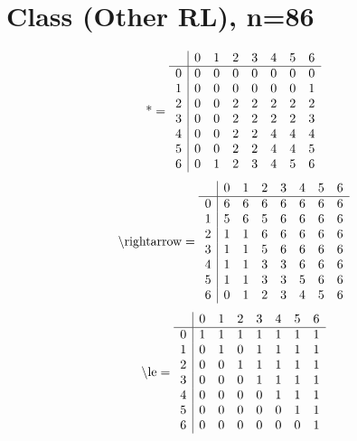 \documentclass[11pt]{article}
\begin{document}
\section{Class (Other RL), n=86}
\[\text{*} = 
\begin{array}{r | r r r r r r r}
 & 0 & 1 & 2 & 3 & 4 & 5 & 6 \\ \hline
0 & 0 & 0 & 0 & 0 & 0 & 0 & 0 \\
1 & 0 & 0 & 0 & 0 & 0 & 0 & 1 \\
2 & 0 & 0 & 2 & 2 & 2 & 2 & 2 \\
3 & 0 & 0 & 2 & 2 & 2 & 2 & 3 \\
4 & 0 & 0 & 2 & 2 & 4 & 4 & 4 \\
5 & 0 & 0 & 2 & 2 & 4 & 4 & 5 \\
6 & 0 & 1 & 2 & 3 & 4 & 5 & 6 \\
\end{array}
\]
\[\text{\textbackslash rightarrow} = 
\begin{array}{r | r r r r r r r}
 & 0 & 1 & 2 & 3 & 4 & 5 & 6 \\ \hline
0 & 6 & 6 & 6 & 6 & 6 & 6 & 6 \\
1 & 5 & 6 & 5 & 6 & 6 & 6 & 6 \\
2 & 1 & 1 & 6 & 6 & 6 & 6 & 6 \\
3 & 1 & 1 & 5 & 6 & 6 & 6 & 6 \\
4 & 1 & 1 & 3 & 3 & 6 & 6 & 6 \\
5 & 1 & 1 & 3 & 3 & 5 & 6 & 6 \\
6 & 0 & 1 & 2 & 3 & 4 & 5 & 6 \\
\end{array}
\]
\[\text{\textbackslash le} = 
\begin{array}{r | r r r r r r r}
 & 0 & 1 & 2 & 3 & 4 & 5 & 6 \\ \hline
0 & 1 & 1 & 1 & 1 & 1 & 1 & 1 \\
1 & 0 & 1 & 0 & 1 & 1 & 1 & 1 \\
2 & 0 & 0 & 1 & 1 & 1 & 1 & 1 \\
3 & 0 & 0 & 0 & 1 & 1 & 1 & 1 \\
4 & 0 & 0 & 0 & 0 & 1 & 1 & 1 \\
5 & 0 & 0 & 0 & 0 & 0 & 1 & 1 \\
6 & 0 & 0 & 0 & 0 & 0 & 0 & 1 \\
\end{array}
\]
\end{document}

